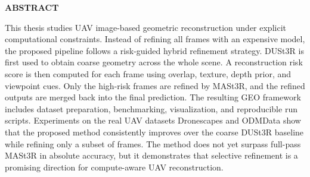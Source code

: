 \documentclass[../DoAn.tex]{subfiles}
\begin{document}
\begin{center}
    \Large{\textbf{ABSTRACT}}\\
\end{center}
\vspace{1cm}
This thesis studies UAV image-based geometric reconstruction under explicit computational constraints. Instead of refining all frames with an expensive model, the proposed pipeline follows a risk-guided hybrid refinement strategy. DUSt3R is first used to obtain coarse geometry across the whole scene. A reconstruction risk score is then computed for each frame using overlap, texture, depth prior, and viewpoint cues. Only the high-risk frames are refined by MASt3R, and the refined outputs are merged back into the final prediction. The resulting GEO framework includes dataset preparation, benchmarking, visualization, and reproducible run scripts. Experiments on the real UAV datasets Dronescapes and ODMData show that the proposed method consistently improves over the coarse DUSt3R baseline while refining only a subset of frames. The method does not yet surpass full-pass MASt3R in absolute accuracy, but it demonstrates that selective refinement is a promising direction for compute-aware UAV reconstruction.
\end{document}
